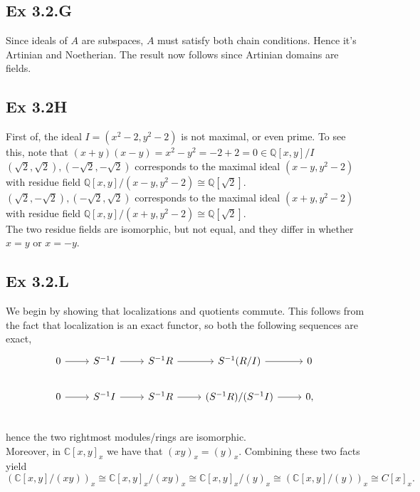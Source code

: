 \documentclass{article}
\theoremstyle{definition}
\newcommand{\Q}{\mathbb{Q}}
\newcommand{\C}{\mathbb{C}}
\begin{document}
\subsection*{Ex 3.2.G}

Since ideals of $A$ are subspaces, $A$ must satisfy both chain conditions.
Hence it's Artinian and Noetherian. The result now follows since Artinian
domains are fields.

\subsection*{Ex 3.2H}

First of, the ideal $I = (x^2 - 2, y^2 - 2)$ is not maximal, or even prime. To
see this, note that $(x + y)(x - y) = x^2 - y^2 = -2 + 2 = 0 \in \Q[x, y] / I$
\\

$(\sqrt{2}, \sqrt{2}), (-\sqrt{2}, -\sqrt{2})$ corresponds to the maximal ideal
$(x - y, y^2 - 2)$ with residue field $\Q[x, y]/(x - y, y^2 - 2) \cong
	\Q[\sqrt{2}]$. \\

$(\sqrt{2}, -\sqrt{2}), (-\sqrt{2}, \sqrt{2})$ corresponds to the maximal ideal
$(x + y, y^2 - 2)$ with residue field $\Q[x, y]/(x + y, y^2 - 2) \cong
	\Q[\sqrt{2}]$. \\

The two residue fields are isomorphic, but not equal, and they differ in
whether $x = y$ or $x = -y$.

\subsection*{Ex 3.2.L}

We begin by showing that localizations and quotients commute. This
follows from the fact that localization is an exact functor, so both the following
sequences are exact,
\[
	\begin{tikzcd}
		0
		\arrow{r} &
		S^{-1}I
		\arrow{r} &
		S^{-1}R
		\arrow{r} &
		S^{-1}(R/I)
		\arrow{r} &
		0 \\
		0
		\arrow{r} &
		S^{-1}I
		\arrow{r} &
		S^{-1}R
		\arrow{r} &
		(S^{-1}R)/(S^{-1}I)
		\arrow{r} &
		0, \\
	\end{tikzcd}
\]
hence the two rightmost modules/rings are isomorphic. \\

Moreover, in $\C[x, y]_x$ we have that $(xy)_x = (y)_x$. Combining these two
facts yield
\[
	(\C[x, y] / (xy))_x
	\cong
	\C[x, y]_x / (xy)_x
	\cong
	\C[x, y]_x / (y)_x
	\cong
	(\C[x, y] / (y))_x
	\cong
	C[x]_x.
\]
\end{document}
